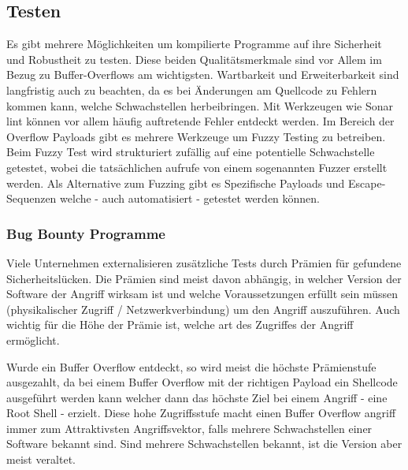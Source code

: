 \subsection{Testen}
Es gibt mehrere Möglichkeiten um kompilierte Programme auf ihre Sicherheit
und Robustheit zu testen. Diese beiden Qualitätsmerkmale sind vor Allem
im Bezug zu Buffer-Overflows am wichtigsten. Wartbarkeit und Erweiterbarkeit
sind langfristig auch zu beachten, da es bei Änderungen am Quellcode
zu Fehlern kommen kann, welche Schwachstellen herbeibringen.
Mit Werkzeugen wie Sonar lint können vor allem häufig auftretende Fehler entdeckt
werden.
Im Bereich der Overflow Payloads gibt es mehrere Werkzeuge um Fuzzy Testing
zu betreiben. Beim Fuzzy Test wird strukturiert zufällig auf eine
potentielle Schwachstelle getestet, wobei die tatsächlichen aufrufe
von einem sogenannten Fuzzer erstellt werden.
Als Alternative zum Fuzzing gibt es Spezifische Payloads und
Escape-Sequenzen welche - auch automatisiert - getestet werden können.

\subsubsection{Bug Bounty Programme}
Viele Unternehmen externalisieren zusätzliche Tests durch Prämien für gefundene Sicherheitslücken.
Die Prämien sind meist davon abhängig, in welcher Version der Software der Angriff 
wirksam ist und welche Voraussetzungen erfüllt sein müssen (physikalischer Zugriff / Netzwerkverbindung)
um den Angriff auszuführen. Auch wichtig für die Höhe der Prämie ist, welche art des Zugriffes
der Angriff ermöglicht.

Wurde ein Buffer Overflow entdeckt, so wird meist die höchste Prämienstufe ausgezahlt, da bei einem
Buffer Overflow mit der richtigen Payload ein Shellcode ausgeführt werden kann welcher dann das
höchste Ziel bei einem Angriff - eine Root Shell - erzielt.
Diese hohe Zugriffsstufe macht einen Buffer Overflow angriff immer zum Attraktivsten Angriffsvektor,
falls mehrere Schwachstellen einer Software bekannt sind. Sind mehrere Schwachstellen bekannt, ist die
Version aber meist veraltet. 




